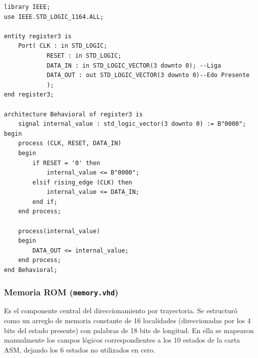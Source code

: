 \documentclass[12pt, letterpaper]{article}
\begin{document}
\begin{lstlisting}[style=vhdl, caption={Código completo del registro de estado.}, label={lst:div_frec}]
library IEEE;
use IEEE.STD_LOGIC_1164.ALL;

entity register3 is
	Port( CLK : in STD_LOGIC;
			RESET : in STD_LOGIC;
			DATA_IN : in STD_LOGIC_VECTOR(3 downto 0); --Liga
			DATA_OUT : out STD_LOGIC_VECTOR(3 downto 0)--Edo Presente
			);
end register3;

architecture Behavioral of register3 is
	signal internal_value : std_logic_vector(3 downto 0) := B"0000";
begin
	process (CLK, RESET, DATA_IN)
	begin
		if RESET = '0' then
			internal_value <= B"0000";
		elsif rising_edge (CLK) then
			internal_value <= DATA_IN;
		end if;
	end process;

	process(internal_value)
	begin
		DATA_OUT <= internal_value;
	end process;
end Behavioral;
\end{lstlisting}

\subsubsection*{Memoria ROM (\texttt{memory.vhd})}

Es el componente central del direccionamiento por trayectoria. Se estructuró como un arreglo de memoria constante de 16 localidades (direccionadas por los 4 bits del estado presente) con palabras de 18 bits de longitud. En ella se mapearon manualmente los campos lógicos correspondientes a los 10 estados de la carta ASM, dejando los 6 estados no utilizados en cero.
\end{document}
